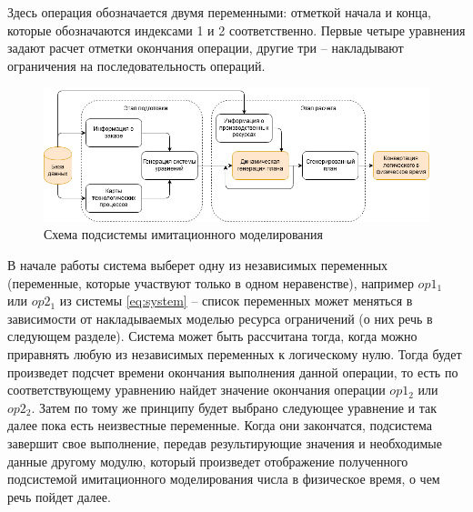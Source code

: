 \indent Здесь операция обозначается двумя переменными: отметкой начала и конца, которые обозначаются индексами 1 и 2 соответственно.
Первые четыре уравнения задают расчет отметки окончания операции, другие три -- накладывают ограничения на последовательность операций.

\begin{figure}[ht]
	\centering
	\includegraphics[width=\linewidth]{pics/imcoreDataflow.png}
	\caption{Схема подсистемы имитационного моделирования}
	\label{fig:imcoreFlow}
\end{figure}

\indent В начале работы система выберет одну из независимых переменных (переменные, которые участвуют только в одном неравенстве), например $op1_1$ или $op2_1$ из системы \ref{eq:system} -- список переменных может меняться в зависимости от накладываемых моделью ресурса ограничений (о них речь в следующем разделе).
Система может быть рассчитана тогда, когда можно приравнять любую из независимых переменных к логическому нулю.
Тогда будет произведет подсчет времени окончания выполнения данной операции, то есть по соответствующему уравнению найдет значение окончания операции $op1_2$ или $op2_2$.
Затем по тому же принципу будет выбрано следующее уравнение и так далее пока есть неизвестные переменные.
Когда они закончатся, подсистема завершит свое выполнение, передав результирующие значения и необходимые данные другому модулю, который произведет отображение полученного подсистемой имитационного моделирования числа в физическое время, о чем речь пойдет далее.